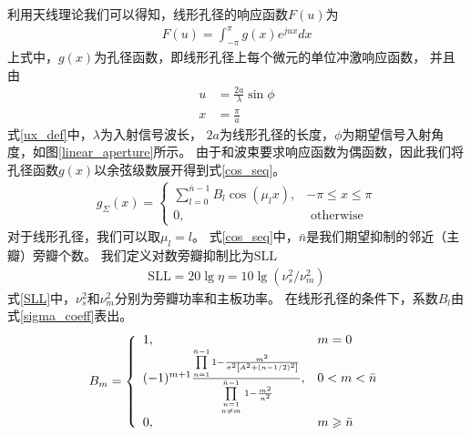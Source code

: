 \documentclass[master]{thesis-uestc}
\begin{document}
利用天线理论我们可以得知，线形孔径的响应函数$F(u)$为
\begin{equation}\label{aperture_response}
    \begin{aligned}
        F(u) = \int_{-\pi}^\pi g(x)e^{jux}dx
    \end{aligned}
\end{equation}
上式中，$g(x)$为孔径函数，即线形孔径上每个微元的单位冲激响应函数，
并且由
\begin{subequations}\label{ux_def}
    \begin{align}
        u &= \frac{2a}{\lambda}\sin\phi
        \\
        x &= \frac{\pi}{a}
    \end{align}
\end{subequations}
式\eqref{ux_def}中，$\lambda$为入射信号波长，
$2a$为线形孔径的长度，$\phi$为期望信号入射角度，如图\ref{linear_aperture}所示。
由于和波束要求响应函数为偶函数，因此我们将孔径函数$g(x)$以余弦级数展开得到式\eqref{cos_seq}。
\begin{equation}\label{cos_seq}
    \begin{aligned}
        g_{\Sigma}(x)=\left\{\begin{array}{ll}
        \sum\limits_{l=0}^{\bar{n}-1} B_{l} \cos \left(\mu_{l} x\right), & -\pi \leqslant x \leqslant \pi
        \\
        0, & \text { otherwise }
        \end{array}\right.
    \end{aligned}
\end{equation}
对于线形孔径，我们可以取$\mu_l=l$。
式\eqref{cos_seq}中，$\bar{n}$是我们期望抑制的邻近（主瓣）旁瓣个数。
我们定义对数旁瓣抑制比为$\text{SLL}$
\begin{equation}\label{SLL}
    \begin{aligned}
        \text{SLL} = 20\lg\eta = 10\lg\left(\nu_s^2/\nu_m^2\right)
    \end{aligned}
\end{equation}
式\eqref{SLL}中，$\nu_s^2$和$\nu_m^2$分别为旁瓣功率和主板功率。
在线形孔径的条件下，系数$B_l$由式\eqref{sigma_coeff}表出。
\begin{equation}\label{sigma_coeff}
    \begin{aligned}
        B_{m}=\left\{\begin{array}{ll}
        1, & m=0 \\
        (-1)^{m+1} \frac{\prod\limits_{n=1}^{\bar{n}-1} 1-\frac{m^{2}}{\sigma^{2}\left[A^{2}+(n-1 / 2)^{2}\right]}}{\prod\limits_{n=1 \atop n \neq m}^{\bar{n}-1} 1-\frac{m^{2}}{n^{2}}}, & 0<m<\bar{n} \\
        0, & m \geqslant \bar{n}
        \end{array}\right.
    \end{aligned}
\end{equation}
\end{document}

